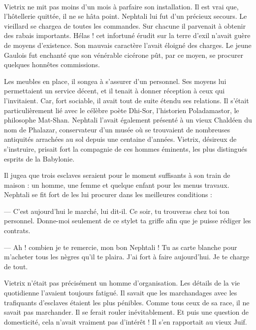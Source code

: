 \documentclass[a4paper, 11pt, oneside, polutonikogreek, french]{article}
\begin{document}
\paragraph{}
Vietrix ne mit pas moins d'un mois à parfaire son installation. Il est vrai que, l'hôtellerie quittée, il ne se hâta point. Nephtali lui fut d'un précieux secours. Le vieillard se chargea de toutes les commandes. Sur chacune il parvenait à obtenir des rabais importants. Hélas ! cet infortuné érudit sur la terre d'exil n'avait guère de moyens d'existence. Son mauvais caractère l'avait éloigné des charges. Le jeune Gaulois fut enchanté que son vénérable cicérone pût, par ce moyen, se procurer quelques honnêtes commissions.

Les meubles en place, il songea à s'assurer d'un personnel. Ses moyens lui permettaient un service décent, et il tenait à donner réception à ceux qui l'invitaient. Car, fort sociable, il avait tout de suite étendu ses relations. Il s'était particulièrement lié avec le célèbre poète Dhi-Sor, l'historien Poladamastor, le philosophe Mat-Shan. Nephtali l'avait également présenté à un vieux Chaldéen du nom de Phalazar, conservateur d'un musée où se trouvaient de nombreuses antiquités arrachées au sol depuis une centaine d'années. Vietrix, désireux de s'instruire, prisait fort la compagnie de ces hommes éminents, les plus distingués esprits de la Babylonie.

\bigskip
\centerline{\EightStarTaper}
\centerline{\EightStarTaper\EightStarTaper}
\bigskip

Il jugea que trois esclaves seraient pour le moment suffisants à son train de maison : un homme, une femme et quelque enfant pour les menus travaux. Nephtali se fit fort de les lui procurer dans les meilleures conditions :

--- C'est aujourd'hui le marché, lui dit-il. Ce soir, tu trouveras chez toi ton personnel. Donne-moi seulement de ce stylet ta griffe afin que je puisse rédiger les contrats.

--- Ah ! combien je te remercie, mon bon Nephtali ! Tu as carte blanche pour m'acheter tous les nègres qu'il te plaira. J'ai fort à faire aujourd'hui. Je te charge de tout.

Vietrix n'était pas précisément un homme d'organisation. Les détails de la vie quotidienne l'avaient toujours fatigué. Il savait que les marchandages avec les trafiquants d'esclaves étaient les plus pénibles. Comme tous ceux de sa race, il ne savait pas marchander. Il se ferait rouler inévitablement. Et puis une question de domesticité, cela n'avait vraiment pas d'intérêt ! Il s'en rapportait au vieux Juif.
\end{document}
